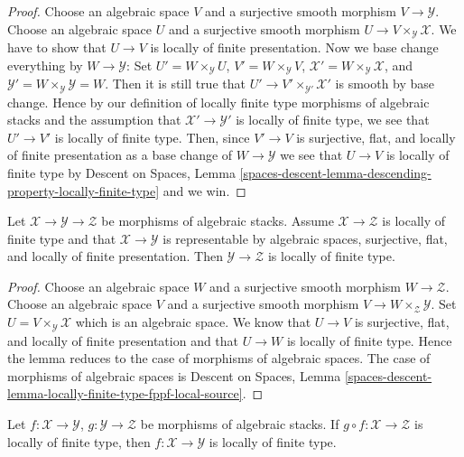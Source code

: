\begin{proof}
Choose an algebraic space $V$ and a surjective smooth morphism
$V \to \mathcal{Y}$. Choose an algebraic space $U$ and a surjective
smooth morphism $U \to V \times_\mathcal{Y} \mathcal{X}$.
We have to show that $U \to V$ is locally of finite presentation.
Now we base change everything by $W \to \mathcal{Y}$: Set
$U' = W \times_\mathcal{Y} U$,
$V' = W \times_\mathcal{Y} V$,
$\mathcal{X}' = W \times_\mathcal{Y} \mathcal{X}$,
and $\mathcal{Y}' = W \times_\mathcal{Y} \mathcal{Y} = W$.
Then it is still true that $U' \to V' \times_{\mathcal{Y}'} \mathcal{X}'$
is smooth by base change. Hence by our definition of locally finite type
morphisms of algebraic stacks and the assumption that
$\mathcal{X}' \to \mathcal{Y}'$ is locally of finite type,
we see that $U' \to V'$ is locally of finite type. Then, since
$V' \to V$ is surjective, flat, and locally of finite presentation
as a base change of $W \to \mathcal{Y}$ we see that $U \to V$ is
locally of finite type by
Descent on Spaces, Lemma
\ref{spaces-descent-lemma-descending-property-locally-finite-type}
and we win.
\end{proof}

\begin{lemma}
\label{lemma-check-finite-type-precompose}
Let $\mathcal{X} \to \mathcal{Y} \to \mathcal{Z}$ be morphisms of
algebraic stacks. Assume $\mathcal{X} \to \mathcal{Z}$ is locally of finite
type and that $\mathcal{X} \to \mathcal{Y}$ is representable by algebraic
spaces, surjective, flat, and locally of finite presentation.
Then $\mathcal{Y} \to \mathcal{Z}$ is locally of finite type.
\end{lemma}

\begin{proof}
Choose an algebraic space $W$ and a surjective smooth morphism
$W \to \mathcal{Z}$. Choose an algebraic space $V$ and a surjective smooth
morphism $V \to W \times_\mathcal{Z} \mathcal{Y}$. Set
$U = V \times_\mathcal{Y} \mathcal{X}$ which is an algebraic space.
We know that $U \to V$ is surjective, flat, and locally of finite presentation
and that $U \to W$ is locally of finite type.
Hence the lemma reduces to the case of morphisms of algebraic spaces.
The case of morphisms of algebraic spaces is
Descent on Spaces, Lemma
\ref{spaces-descent-lemma-locally-finite-type-fppf-local-source}.
\end{proof}

\begin{lemma}
\label{lemma-finite-type-permanence}
Let $f : \mathcal{X} \to \mathcal{Y}$,
$g : \mathcal{Y} \to \mathcal{Z}$ be morphisms of algebraic stacks.
If $g \circ f : \mathcal{X} \to \mathcal{Z}$ is locally of finite type,
then $f : \mathcal{X} \to \mathcal{Y}$ is locally of finite type.
\end{lemma}

